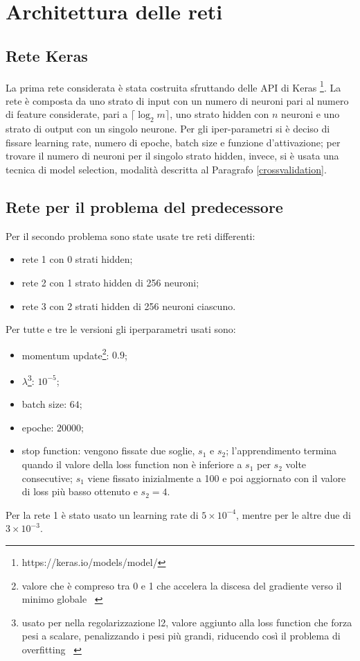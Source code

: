 \documentclass[12pt]{report}
\begin{document}
\section{Architettura delle reti}\label{architettura}
\subsection{Rete Keras}
La prima rete considerata è stata costruita sfruttando delle API di Keras \footnote{https://keras.io/models/model/}. La rete è composta da uno strato di input con un numero di neuroni pari al numero di feature considerate, pari a $\lceil\log_2 m\rceil$, uno strato hidden con $n$ neuroni e uno strato di output con un singolo neurone. Per gli iper-parametri si è deciso di fissare learning rate, numero di epoche, batch size e funzione d'attivazione; per trovare il numero di neuroni per il singolo strato hidden, invece, si è usata una tecnica di model selection, modalità descritta al Paragrafo \ref{crossvalidation}.

\subsection{Rete per il problema del predecessore}\label{reteAdHoc}
Per il secondo problema sono state usate tre reti differenti:
\begin{itemize}
\item{rete 1 con 0 strati hidden};
\item{rete 2 con 1 strato hidden di 256 neuroni};
\item{rete 3 con 2 strati hidden di 256 neuroni ciascuno}.
\end{itemize}

Per tutte e tre le versioni gli iperparametri usati sono:
\begin{itemize}
\item{momentum update}\footnote{valore che è compreso tra 0 e 1 che accelera la discesa del gradiente verso il minimo globale ~\cite{Momentum}}: $0.9$;
\item{$\lambda$}\footnote{usato per nella regolarizzazione l2, valore aggiunto alla loss function che forza pesi a scalare, penalizzando i pesi più grandi, riducendo così il problema di overfitting ~\cite{L2}}: $10^{-5}$;
\item{batch size}: $64$;
\item{epoche}: $20000$;
\item{stop function}: vengono fissate due soglie, $s_1$ e $s_2$; l'apprendimento termina quando il valore della loss function non è inferiore a $s_1$ per $s_2$ volte consecutive; $s_1$ viene fissato inizialmente a 100 e poi aggiornato con il valore di loss più basso ottenuto e $s_2 = 4$.
\end{itemize}
Per la rete 1 è stato usato un learning rate di $5 \times 10^{-4}$, mentre per le altre due di $3 \times 10^{-3}$.
\end{document}
